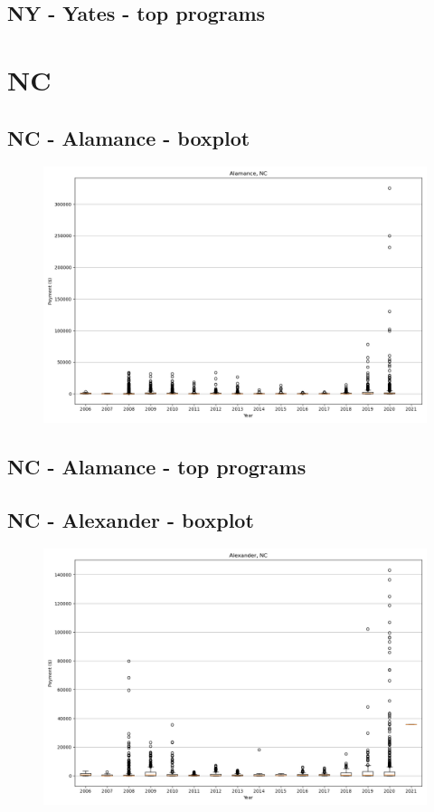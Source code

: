 \subsection*{NY - Yates - top programs}

\newpage
\section*{NC}
\subsection*{NC - Alamance - boxplot}
\begin{figure}[h]
\centering
\includegraphics[width=7in]{../output/boxplots/counties/Alamance-NC_boxplot.png}
\end{figure}


\subsection*{NC - Alamance - top programs}

\newpage
\subsection*{NC - Alexander - boxplot}
\begin{figure}[h]
\centering
\includegraphics[width=7in]{../output/boxplots/counties/Alexander-NC_boxplot.png}
\end{figure}


